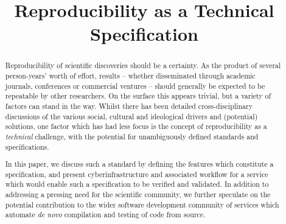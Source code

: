 \documentclass[conference]{IEEEtran}
\begin{document}
%
\title{Reproducibility as a Technical Specification}


\author{
\and
{}
\and
{}
}





\maketitle


\begin{abstract}
Reproducibility of scientific discoveries should be a certainty. As
the product of several person-years' worth of effort, results --
whether disseminated through academic journals, conferences or
commercial ventures -- should generally be expected to be repeatable
by other researchers. On the surface this appears trivial, but a
variety of factors can stand in the way. Whilst there has been
detailed cross-disciplinary discussions of the various social,
cultural and ideological drivers and (potential) solutions, one factor
which has had less focus is the concept of reproducibility as a
\emph{technical} challenge, with the potential for unambiguously
defined standards and specifications.

In this paper, we discuss such a standard by defining the features
which constitute a specification, and present cyberinfrastructure and
associated workflow for a service which would enable such a
specification to be verified and validated. In addition to addressing
a pressing need for the scientific community, we further speculate on
the potential contribution to the wider software development community
of services which automate \emph{de novo} compilation and testing of
code from source.
\end{abstract}
\end{document}
